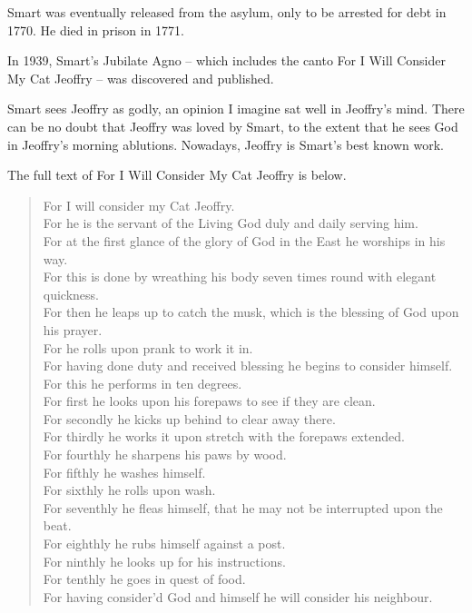 Smart was eventually released from the asylum, only to be arrested for debt in 1770. He died in prison in 1771.

In 1939, Smart's Jubilate Agno -- which includes the canto For I Will Consider My Cat Jeoffry -- was discovered and published.

Smart sees Jeoffry as godly, an opinion I imagine sat well in Jeoffry's mind. There can be no doubt that Jeoffry was loved by Smart, to the extent that he sees God in Jeoffry's morning ablutions. Nowadays, Jeoffry is Smart's best known work.

The full text of For I Will Consider My Cat Jeoffry is below.

\begin{verse}
  For I will consider my Cat Jeoffry.\\
  For he is the servant of the Living God duly and daily serving him.\\
  For at the first glance of the glory of God in the East he worships in his way.\\
  For this is done by wreathing his body seven times round with elegant quickness.\\
  For then he leaps up to catch the musk, which is the blessing of God upon his prayer.\\
  For he rolls upon prank to work it in.\\
  For having done duty and received blessing he begins to consider himself.\\
  For this he performs in ten degrees.\\
  For first he looks upon his forepaws to see if they are clean.\\
  For secondly he kicks up behind to clear away there.\\
  For thirdly he works it upon stretch with the forepaws extended.\\
  For fourthly he sharpens his paws by wood.\\
  For fifthly he washes himself.\\
  For sixthly he rolls upon wash.\\
  For seventhly he fleas himself, that he may not be interrupted upon the beat.\\
  For eighthly he rubs himself against a post.\\
  For ninthly he looks up for his instructions.\\
  For tenthly he goes in quest of food.\\
  For having consider'd God and himself he will consider his neighbour.\\

\end{verse}
